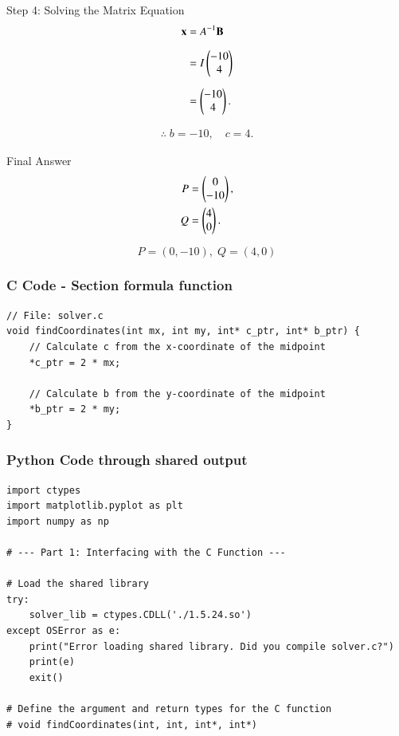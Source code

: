 \documentclass{beamer}
\begin{document}
\begin{frame}{Step 4: Solving the Matrix Equation}
\begin{align*}
\mathbf{x} &= A^{-1}\mathbf{B} \\[6pt]
&= I \begin{pmatrix}-10 \\ 4\end{pmatrix} \\[6pt]
&= \begin{pmatrix}-10 \\ 4\end{pmatrix}.
\end{align*}

\begin{align*}
\therefore \; b = -10, \quad c = 4.
\end{align*}
\end{frame}


\begin{frame}{Final Answer}
\begin{align*}
P &= \begin{pmatrix}0 \\ -10\end{pmatrix}, \\
Q &= \begin{pmatrix}4 \\ 0\end{pmatrix}.
\end{align*}

\[
\boxed{P=(0,-10),\; Q=(4,0)}
\]
\end{frame}

\begin{frame}[fragile]
\frametitle{C Code - Section formula function}
\begin{lstlisting}
// File: solver.c
void findCoordinates(int mx, int my, int* c_ptr, int* b_ptr) {
    // Calculate c from the x-coordinate of the midpoint
    *c_ptr = 2 * mx;

    // Calculate b from the y-coordinate of the midpoint
    *b_ptr = 2 * my;
}
\end{lstlisting}
\end{frame}

\begin{frame}[fragile]
	\frametitle{Python Code through shared output}
	\begin{lstlisting}
import ctypes
import matplotlib.pyplot as plt
import numpy as np

# --- Part 1: Interfacing with the C Function ---

# Load the shared library
try:
    solver_lib = ctypes.CDLL('./1.5.24.so')
except OSError as e:
    print("Error loading shared library. Did you compile solver.c?")
    print(e)
    exit()

# Define the argument and return types for the C function
# void findCoordinates(int, int, int*, int*)
        \end{lstlisting}
        \end{frame}
        
\end{document}
